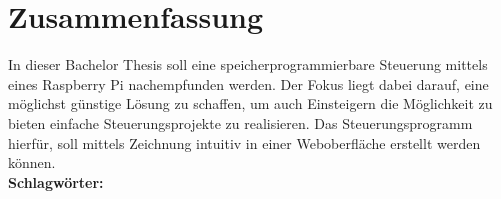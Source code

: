 \thispagestyle{empty}
\section*{Zusammenfassung}
In dieser Bachelor Thesis soll eine speicherprogrammierbare Steuerung mittels eines Raspberry Pi nachempfunden werden. Der Fokus liegt dabei darauf, eine möglichst günstige Lösung zu schaffen, um auch Einsteigern die Möglichkeit zu bieten einfache Steuerungsprojekte zu realisieren. Das Steuerungsprogramm hierfür, soll mittels Zeichnung intuitiv in einer Weboberfläche erstellt werden können.
\\[0.5cm]
\textbf{Schlagwörter:} \keywords
